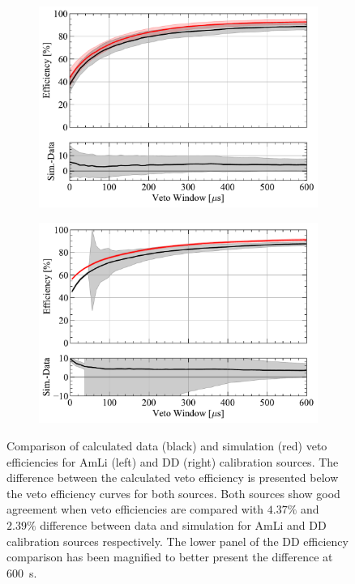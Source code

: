 \begin{figure}[h!]
    \centering
    \begin{subfigure}[b]{0.49\textwidth}
        \centering
        \includegraphics[width=\textwidth]{figures/VetoEfficiency/AmLi_Total_Avg_Ratio.pdf}
        \caption{}
        \label{fig:VetoEff/Sim2DataVetoEffComparisons_AmLi}
    \end{subfigure}
    \hfill
    \begin{subfigure}[b]{0.49\textwidth}
        \centering
        \includegraphics[width=\textwidth]{figures/VetoEfficiency/DDDirect_Total_Ratio.pdf}
        \caption{}
        \label{fig:VetoEff/Sim2DataVetoEffComparisons_DD}
    \end{subfigure}
    \caption{Comparison of calculated data (black) and simulation (red) veto efficiencies for AmLi (left) and DD (right) calibration sources. The difference between the calculated veto efficiency is presented below the veto efficiency curves for both sources. Both sources show good agreement when veto efficiencies are compared with $4.37\%$ and $2.39\%$ difference between data and simulation for AmLi and DD calibration sources respectively. The lower panel of the DD efficiency comparison has been magnified to better present the difference at 600~\textmu s.}
    \label{fig:VetoEff/Sim2DataVetoEffComparisons}
\end{figure}

